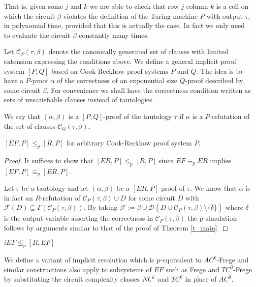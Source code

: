 \documentclass{LMCS}
\theoremstyle{plain}\newtheorem{satz}[thm]{Satz}
\begin{document}
That is, given some $j$ and $k$ we are able to check that row $j$ column $k$ is a cell on which the circuit $\beta$ violates the definition of the Turing machine $P$ with output $\tau$, in polynomial time, provided that this is actually the case. In fact we only need to evaluate the circuit $\beta$ constantly many times.

Let ${\mathcal C}_P(\tau, \beta)$ denote the canonically generated set of clauses with limited extension expressing the conditions above. We define a general implicit proof system $[P,Q]$ based on Cook-Reckhow proof systems $P$ and $Q$. The idea is to have a $P$-proof $\alpha$ of the correctness of an exponential size $Q$-proof described by some circuit $\beta$. For convenience we shall have the correctness condition written as sets of unsatisfiable clauses instead of tautologies.

\begin{defi}
We say that $(\alpha,\beta)$ is a $[P,Q]$-proof of the tautology $\tau$ if $\alpha$ is a $P$-refutation of the set of clauses ${\mathcal C}_Q(\tau, \beta)$.
\end{defi}

\begin{thm}
\label{t_gen}
$[EF,P] \leq_p [R,P]$ for arbitrary Cook-Reckhow proof system $P$.
\begin{proof}
It suffices to show that $[ER,P] \leq_p [R,P]$ since $EF \equiv_p ER$ implies $[EF,P] \equiv_p [ER,P]$.

Let $\tau$ be a tautology and let $(\alpha, \beta)$ be a $[ER,P]$-proof of $\tau$. We know that $\alpha$ is in fact an $R$-refutation of ${\mathcal C}_P(\tau,\beta) \cup D$ for some circuit $D$ with ${\mathcal F}(D) \subseteq \Gamma({\mathcal C}_P(\tau,\beta))$. By taking $\beta' := \beta \cup {\mathcal D}(D \cup {\mathcal C}_P(\tau,\beta) \setminus \{ \overline{\delta} \})$ where $\delta$ is the output variable asserting the correctness in ${\mathcal C}_P(\tau,\beta)$ the p-simulation follows by arguments similar to that of the proof of Theorem \ref{t_main}.
\end{proof}
\end{thm}

\begin{cor}
$iEF \leq_p [R,EF]$
\end{cor}

We define a variant of implicit resolution which is p-equivalent to $AC^0$-Frege and similar constructions also apply to subsystems of $EF$ such as Frege and $TC^0$-Frege by substituting the circuit complexity classes $NC^1$ and $TC^0$ in place of $AC^0$.
\end{document}
